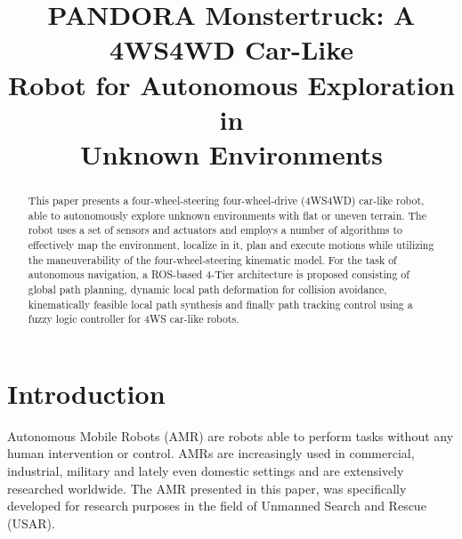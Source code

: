 \documentclass[conference]{IEEEtran}
\begin{document}
\title{PANDORA Monstertruck: A 4WS4WD Car-Like\\Robot for Autonomous Exploration in\\Unknown Environments}


\author{
\and
{}
}

\maketitle

\begin{abstract}
This paper presents a four-wheel-steering four-wheel-drive (4WS4WD) car-like robot, able to autonomously explore unknown environments with flat or uneven terrain. The robot uses a set of sensors and actuators and employs a number of algorithms to effectively map the environment, localize in it, plan and execute motions while utilizing the maneuverability of the four-wheel-steering kinematic model. For the task of autonomous navigation, a ROS-based 4-Tier architecture is proposed consisting of global path planning, dynamic local path deformation for collision avoidance, kinematically feasible local path synthesis and finally path tracking control using a fuzzy logic controller for 4WS car-like robots.
\end{abstract}


\section{Introduction} \label{sec:introduction}
Autonomous Mobile Robots (AMR) are robots able to perform tasks without any human intervention or control. AMRs are increasingly used in commercial, industrial, military and lately even domestic settings and are extensively researched worldwide. The AMR presented in this paper, was specifically developed for research purposes in the field of Unmanned Search and Rescue (USAR).
\end{document}

